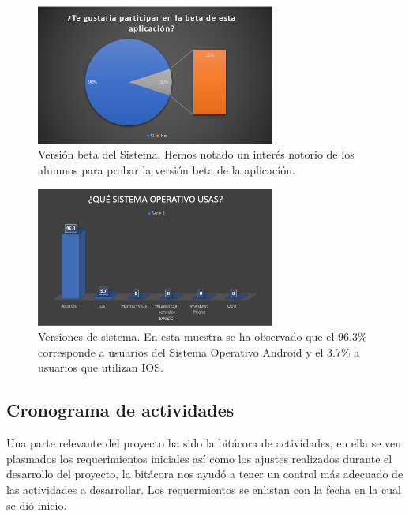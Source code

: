 \documentclass[10pt]{article}
\begin{document}
\par\vspace{\baselineskip}
\begin{figure}[H]
    \begin{center}
        \includegraphics[width=0.7\textwidth]{Imagenes/7.PNG}
        \caption{Versión beta del Sistema. Hemos notado un interés notorio de los alumnos para probar la versión beta de la aplicación. }
        \label{fig6}
    \end{center}
\end{figure}
\par\vspace{\baselineskip}
\begin{figure}[H]
    \begin{center}
        \includegraphics[width=0.7\textwidth]{Imagenes/8.PNG}
        \caption{Versiones de sistema. En esta muestra se ha observado que el 96.3\% corresponde a usuarios del Sistema Operativo Android y el 3.7\% a usuarios que utilizan IOS. }
        \label{fig7}
    \end{center}
\end{figure}

\subsection{Cronograma de actividades}
\justify
Una parte relevante del proyecto ha sido la bitácora de actividades, en ella se ven plasmados los requerimientos iniciales así como los ajustes realizados durante el desarrollo del proyecto, la bitácora nos ayudó a tener un control más adecuado de las actividades a desarrollar. Los requermientos se enlistan con la fecha en la cual se dió inicio.
\end{document}
